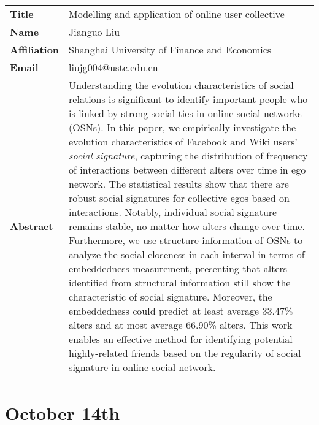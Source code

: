 \documentclass[oneside,A4paper,12pt]{article}
\begin{document}
\newpage
\begin{longtable}{p{2cm}p{14cm}}
\toprule
\textbf{Title} & Modelling and application of online user collective\\
\textbf{Name} & Jianguo Liu\\
\textbf{Affiliation} & Shanghai University of Finance and Economics\\
\textbf{Email} & liujg004@ustc.edu.cn\\
\textbf{Abstract} & Understanding the evolution characteristics of social relations is significant to identify important people who is linked by strong social ties in online social networks (OSNs). In this paper, we empirically investigate the evolution characteristics of Facebook and Wiki users' \emph{social signature}, capturing the distribution of frequency of interactions between different alters over time in ego network. The statistical results show that there are robust social signatures for collective egos based on interactions. Notably, individual social signature remains stable, no matter how alters change over time. Furthermore, we use structure information of OSNs to analyze the social closeness in each interval in terms of embeddedness measurement, presenting that alters identified from structural information still show the characteristic of social signature. Moreover, the embeddedness could predict at least average 33.47\% alters and at most average 66.90\% alters. This work enables an effective method for identifying potential highly-related friends based on the regularity of social signature in online social network.\\
\bottomrule
\end{longtable}

\newpage

\section*{October 14th}
\label{sec:orgf2f358a}
\end{document}

